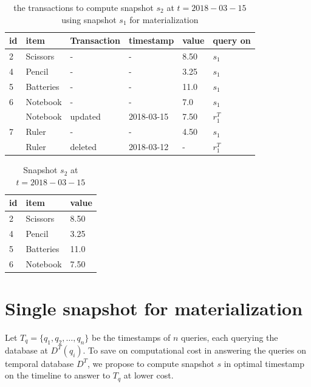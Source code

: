 			\begin{center}
			\begin{table}
				\centering
				\caption{the transactions to compute snapshot $s_2$ at $t = 2018-03-15$ using snapshot $s_1$ for materialization}
				\label{table:transactions_materialized}
				\begin{tabular}{p{1cm}p{2cm}p{2cm}p{3cm}p{2cm}p{2cm}}
					\hline
					id & item & Transaction  &timestamp & value  &query on\\ \hline
					2 & Scissors & - & - & 8.50 & $s_1$ \\ \hline
				  	4 & Pencil & - & - & 3.25 & $s_1$ \\ \hline
			  	  	5 & Batteries & - & - & 11.0 & $s_1$ \\ \hline
					6 & Notebook & - & - & 7.0 & $s_1$ \\ 
					  & Notebook & updated & 2018-03-15 & 7.50 & $r_1^T$ \\ \hline
					7 & Ruler & - & - & 4.50 & $s_1$ \\
					  & Ruler & deleted & 2018-03-12 & - & $r_1^T$ \\ \hline
				\end{tabular}
			\end{table}
			\end{center}

			\begin{center}
			\begin{table}
				\centering
				\caption{Snapshot $s_2$ at $t = 2018-03-15$}
				\label{table:snapshot_s2}
				\begin{tabular}{p{4cm}p{4cm}p{4cm}}
					\hline
					id & item  & value  \\ \hline
					2 & Scissors & 8.50   \\ 
					4 & Pencil & 3.25   \\ 
					5 & Batteries & 11.0   \\ 
					6 & Notebook & 7.50 \\ \hline
				\end{tabular}
			\end{table}
			\end{center}

	\section{Single snapshot for materialization} \label{sec:optimal_materialization}
		Let $T_q = \{q_1, q_2, \dots, q_n\}$ be the timestamps of $n$ queries, each querying the database at $D^T(q_i)$. To save on computational cost in answering the queries on temporal database $D^T$, we propose to compute snapshot $s$ in optimal timestamp on the timeline to answer to $T_q$ at lower cost. 

